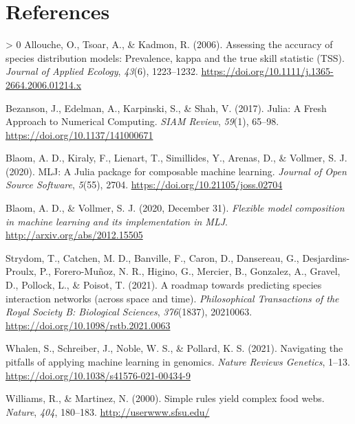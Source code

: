 \documentclass[11pt]{article}
\newlength{\cslhangindent}
\newenvironment{CSLReferences}[3] %
 {%
  \setlength{\parindent}{0pt}
  \ifodd #1 \everypar{\setlength{\hangindent}{\cslhangindent}}\ignorespaces\fi
  \ifnum #2 > 0
  \setlength{\parskip}{#2\baselineskip}
  \fi
 }%
 {}
\begin{document}
\hypertarget{references}{%
\section*{References}\label{references}}

\hypertarget{refs}{}
\begin{CSLReferences}{1}{0}
\leavevmode\hypertarget{ref-Allouche2006AssAcc}{}%
Allouche, O., Tsoar, A., \& Kadmon, R. (2006). Assessing the accuracy of
species distribution models: Prevalence, kappa and the true skill
statistic (TSS). \emph{Journal of Applied Ecology}, \emph{43}(6),
1223--1232. \url{https://doi.org/10.1111/j.1365-2664.2006.01214.x}

\leavevmode\hypertarget{ref-Bezanson2017JulFre}{}%
Bezanson, J., Edelman, A., Karpinski, S., \& Shah, V. (2017). Julia: A
Fresh Approach to Numerical Computing. \emph{SIAM Review}, \emph{59}(1),
65--98. \url{https://doi.org/10.1137/141000671}

\leavevmode\hypertarget{ref-Blaom2020MljJul}{}%
Blaom, A. D., Kiraly, F., Lienart, T., Simillides, Y., Arenas, D., \&
Vollmer, S. J. (2020). MLJ: A Julia package for composable machine
learning. \emph{Journal of Open Source Software}, \emph{5}(55), 2704.
\url{https://doi.org/10.21105/joss.02704}

\leavevmode\hypertarget{ref-Blaom2020FleMod}{}%
Blaom, A. D., \& Vollmer, S. J. (2020, December 31). \emph{Flexible
model composition in machine learning and its implementation in MLJ}.
\url{http://arxiv.org/abs/2012.15505}

\leavevmode\hypertarget{ref-Strydom2021RoaPre}{}%
Strydom, T., Catchen, M. D., Banville, F., Caron, D., Dansereau, G.,
Desjardins-Proulx, P., Forero-Muñoz, N. R., Higino, G., Mercier, B.,
Gonzalez, A., Gravel, D., Pollock, L., \& Poisot, T. (2021). A roadmap
towards predicting species interaction networks (across space and time).
\emph{Philosophical Transactions of the Royal Society B: Biological
Sciences}, \emph{376}(1837), 20210063.
\url{https://doi.org/10.1098/rstb.2021.0063}

\leavevmode\hypertarget{ref-Whalen2021NavPit}{}%
Whalen, S., Schreiber, J., Noble, W. S., \& Pollard, K. S. (2021).
Navigating the pitfalls of applying machine learning in genomics.
\emph{Nature Reviews Genetics}, 1--13.
\url{https://doi.org/10.1038/s41576-021-00434-9}

\leavevmode\hypertarget{ref-Williams2000SimRul}{}%
Williams, R., \& Martinez, N. (2000). Simple rules yield complex food
webs. \emph{Nature}, \emph{404}, 180--183.
\href{http://userwww.sfsu.edu/\%20}{http://userwww.sfsu.edu/}

\end{CSLReferences}
\end{document}
